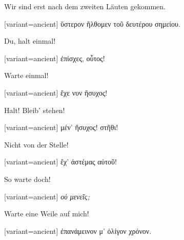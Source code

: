 Wir sind erst nach dem zweiten Läuten gekommen.

\switchcolumn

\begin{greek}[variant=ancient]%
ὕστερον ἤλθομεν τοῦ δευτέρου σημείου.

\end{greek}%
\indent Du, halt einmal!

\switchcolumn

\begin{greek}[variant=ancient]%
ἐπίσχες, οὗτος!

\end{greek}%
\switchcolumn*

Warte einmal!

\switchcolumn

\begin{greek}[variant=ancient]%
ἔχε νυν ἥσυχος!

\end{greek}%
\switchcolumn*

Halt! Bleib' stehen!

\switchcolumn

\begin{greek}[variant=ancient]%
μέν' ἥσυχος! στῆθι!

\end{greek}%
\switchcolumn*

Nicht von der Stelle!

\switchcolumn

\begin{greek}[variant=ancient]%
ἔχ' ἀστέμας αὐτοῦ!

\end{greek}%
\switchcolumn*

So warte doch!

\switchcolumn

\begin{greek}[variant=ancient]%
\emph{οὐ μενεῖς;}

\end{greek}%
\switchcolumn*

Warte eine Weile auf mich!

\switchcolumn

\begin{greek}[variant=ancient]%
ἐπανάμεινον μ' ὀλίγον χρόνον.

\end{greek}%
\switchcolumn*

